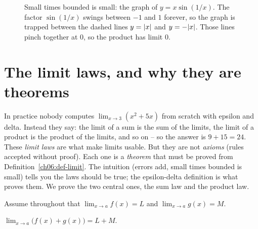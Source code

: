 \begin{figure}[htbp]
\centering
{}
\caption{Small times bounded is small: the graph of $y=x\sin(1/x)$. The
factor $\sin(1/x)$ swings between $-1$ and $1$ forever, so the graph is trapped
between the dashed lines $y=\lvert x\rvert$ and $y=-\lvert x\rvert$. Those lines pinch
together at $0$, so the product has limit $0$.}
\label{ch06:fig-stb}
\end{figure}

\section{The limit laws, and why they are theorems}
\label{ch06:laws}

In practice nobody computes $\lim_{x\to 3}(x^2+5x)$ from scratch with epsilon and
delta. Instead they say: the limit of a sum is the sum of the limits, the limit
of a product is the product of the limits, and so on -- so the answer is $9+15 =
24$. These \emph{limit laws} are what make limits usable. But they are not
\emph{axioms} (rules accepted without proof). Each one is a \emph{theorem} that
must be proved from Definition~\ref{ch06:def-limit}. The intuition (errors add,
small times bounded is small) tells you the laws should be true; the
epsilon-delta definition is what proves them. We prove the two central ones,
the sum law and the product law.

Assume throughout that $\lim_{x\to a} f(x) = L$ and $\lim_{x\to a} g(x) = M$.

\begin{theorem}
\label{ch06:thm-sum}
$\displaystyle \lim_{x\to a}\big(f(x)+g(x)\big) = L + M.$
\end{theorem}

